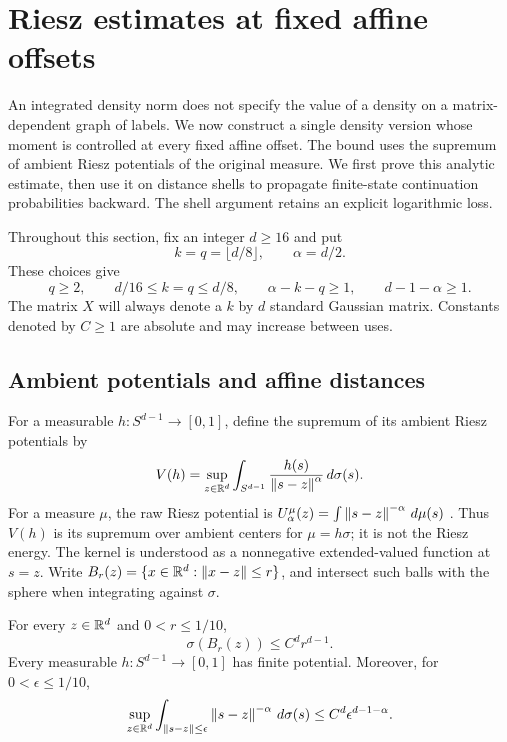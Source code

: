 \section{Riesz estimates at fixed affine offsets}
\label{p:riesz-section}

An integrated density norm does not specify the value of a density on a
matrix-dependent graph of labels. We now construct a single density
version whose moment is controlled at every fixed affine offset. The
bound uses the supremum of ambient Riesz potentials of the original
measure. We first prove this analytic estimate, then use it on distance
shells to propagate finite-state continuation probabilities backward.
The shell argument retains an explicit logarithmic loss.

Throughout this section, fix an integer $d\ge16$ and put
\begin{equation}\label{p:riesz-parameters}
 k=q=\lfloor d/8\rfloor,\qquad \alpha=d/2.
\end{equation}
These choices give
\[
 q\ge2,\qquad d/16\le k=q\le d/8,\qquad
 \alpha-k-q\ge1,\qquad d-1-\alpha\ge1.
\]
The matrix $X$ will always denote a $k$ by $d$ standard Gaussian matrix.
Constants denoted by $C\ge1$ are absolute and may increase between uses.

\subsection{Ambient potentials and affine distances}

For a measurable $h:S^{d-1}\to[0,1]$, define the supremum of its
ambient Riesz potentials by
\begin{equation}\label{p:riesz-potential}
 V(h)=\sup_{z\in\mathbb R^d}
       \int_{S^{d-1}}\frac{h(s)}{\left\lVert s-z\right\rVert^{\alpha}}\,d\sigma(s).
\end{equation}
For a measure $\mu$, the raw Riesz potential is
$U_\alpha^\mu(z)=\int\left\lVert s-z\right\rVert^{-\alpha}\,d\mu(s)$
\cite[Section~1, p.~2]{CalefHardin2008v1}. Thus $V(h)$ is its supremum
over ambient centers for $\mu=h\sigma$; it is not the Riesz energy.
The kernel is understood as a nonnegative extended-valued function
at $s=z$. Write $B_r(z)=\{x\in\mathbb R^d:\left\lVert x-z\right\rVert\le r\}$, and
intersect such balls with the sphere when integrating against
$\sigma$.

\begin{lemma}\label{p:riesz-potential-finite}
For every $z\in\mathbb R^d$ and $0<r\le1/10$,
\begin{equation}\label{p:riesz-cap}
 \sigma(B_r(z))\le C^d r^{d-1}.
\end{equation}
Every measurable $h:S^{d-1}\to[0,1]$ has finite potential. Moreover, for
$0<\epsilon\le1/10$,
\begin{equation}\label{p:riesz-inner}
 \sup_{z\in\mathbb R^d}
 \int_{\left\lVert s-z\right\rVert\le\epsilon}\left\lVert s-z\right\rVert^{-\alpha}\,d\sigma(s)
 \le C^d\epsilon^{d-1-\alpha}.
\end{equation}
\end{lemma}

